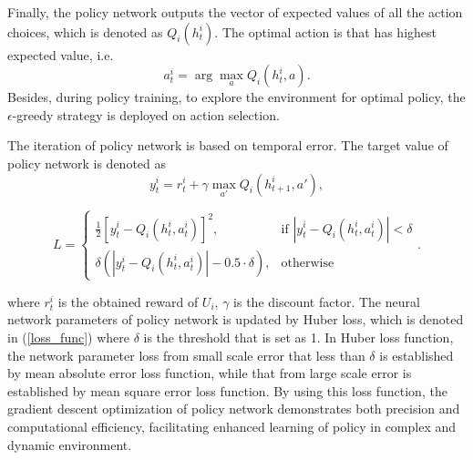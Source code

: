\documentclass[journal]{IEEEtran}
\begin{document}
Finally, the policy network outputs the vector of expected values of all the action choices, which is denoted as $Q_i\left(h^i_t\right)$. The optimal action is that has highest expected value, i.e. 
\begin{equation}\label{action_choose}
  a^i_t=\arg\max_a Q_i\left(h^i_t,a\right).
\end{equation}
Besides, during policy training, to explore the environment for optimal policy, the $\epsilon$-greedy strategy is deployed on action selection. 

The iteration of policy network is based on temporal error. The target value of policy network is denoted as  
\begin{equation}\label{y_def}
  y^i_t=r^i_t+\gamma \mathop{\max}\limits_{a'} Q_i\left({h^i_{t+1},a'}\right),
\end{equation}
\begin{figure}[htb]
  \begin{equation}\label{loss_func}
  L=
    \begin{cases}
            \frac{1}{2}\left[{y^i_t-Q_i\left({h^i_t,a^i_t}\right)}\right]^2, & \mbox{if $| y^i_t - Q_i\left({h^i_t,a^i_t}\right) | < \delta$}\\
            \delta\left({| y^i_t - Q_i\left({h^i_t,a^i_t}\right) |-0.5\cdot\delta}\right), & \mbox{otherwise}
    \end{cases}
  .
\end{equation}
  \centering
  \vspace*{1pt}
  \hrulefill
  \vspace*{1pt}
\end{figure}
where $r^i_t$ is the obtained reward of $U_i$, $\gamma$ is the discount factor. The neural network parameters of policy network is updated by Huber loss, which is denoted in (\ref{loss_func}) where $\delta$ is the threshold that is set as 1. In Huber loss function, the network parameter loss from small scale error that less than $\delta$ is established by mean absolute error loss function, while that from large scale error is established by mean square error loss function. By using this loss function, the gradient descent optimization of policy network demonstrates both precision and computational efficiency, facilitating enhanced learning of policy in complex and dynamic environment. 
\end{document}
